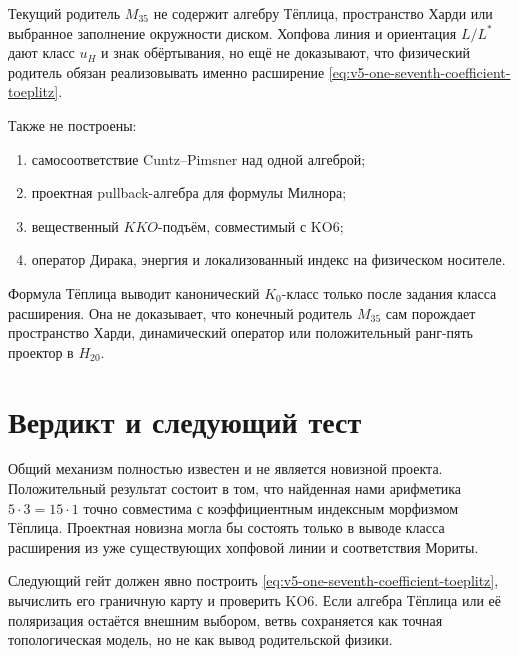 Текущий родитель $M_{35}$ не содержит алгебру Тёплица, пространство Харди
или выбранное заполнение окружности диском. Хопфова линия и ориентация
$L/L^*$ дают класс $u_H$ и знак обёртывания, но ещё не доказывают, что
физический родитель обязан реализовывать именно расширение
\eqref{eq:v5-one-seventh-coefficient-toeplitz}.

Также не построены:
\begin{enumerate}
 \item самосоответствие Cuntz--Pimsner над одной алгеброй;
 \item проектная pullback-алгебра для формулы Милнора;
 \item вещественный $KKO$-подъём, совместимый с KO6;
 \item оператор Дирака, энергия и локализованный индекс на физическом
 носителе.
\end{enumerate}

\begin{nogocriterion}
Формула Тёплица выводит канонический $K_0$-класс только после задания
класса расширения. Она не доказывает, что конечный родитель $M_{35}$ сам
порождает пространство Харди, динамический оператор или положительный
ранг-пять проектор в $H_{20}$.
\end{nogocriterion}

\section{Вердикт и следующий тест}

Общий механизм полностью известен и не является новизной проекта.
Положительный результат состоит в том, что найденная нами арифметика
$5\cdot3=15\cdot1$ точно совместима с коэффициентным индексным
морфизмом Тёплица. Проектная новизна могла бы состоять только в выводе
класса расширения из уже существующих хопфовой линии и соответствия
Мориты.

Следующий гейт должен явно построить
\eqref{eq:v5-one-seventh-coefficient-toeplitz}, вычислить его граничную
карту и проверить KO6. Если алгебра Тёплица или её поляризация остаётся
внешним выбором, ветвь сохраняется как точная топологическая модель, но не
как вывод родительской физики.

